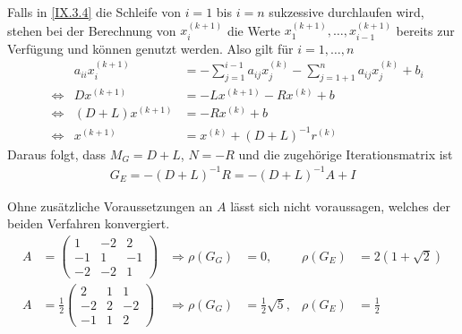 Falls in \eqref{IX.3.4} die Schleife von $i=1$ bis $i=n$
sukzessive durchlaufen wird, stehen bei der Berechnung von
$x_i^{(k+1)}$ die Werte $x_1^{(k+1)},\ldots,x_{i-1}^{(k+1)}$
bereits zur Verfügung und können genutzt werden.
Also gilt für $i=1,\ldots,n$
\begin{align}
  &&a_{ii}x_i^{(k+1)} & = -\sum_{j=1}^{i-1}a_{ij}x_j^{(k)}
                        -\sum_{j=1+1}^{n}a_{ij}x_j^{(k)}+ b_i
                        \label{IX.3.5} \\\nonumber
  &\Longleftrightarrow &Dx^{(k+1)}&=-Lx^{(k+1)}-Rx^{(k)}+b \\
  &\Longleftrightarrow &(D+L)x^{(k+1)}&=-Rx^{(k)}+b
                                    \label{IX.3.6} \\\nonumber
  &\Longleftrightarrow &x^{(k+1)} &= x^{(k)}+(D+L)^{-1}r^{(k)}
\end{align}
Daraus folgt, dass $M_G=D+L$, $N=-R$ 
und die zugehörige Iterationsmatrix ist 
\begin{gather*}
  G_E = -(D+L)^{-1}R = -(D+L)^{-1}A+I
\end{gather*}

\begin{Bspe}
  Ohne zusätzliche Voraussetzungen an $A$ lässt sich
  nicht voraussagen, welches der beiden Verfahren konvergiert.
  \begin{align*}
    A&= \begin{pmatrix}
      1&-2&2\\
      -1&1&-1\\
      -2&-2&1
    \end{pmatrix}
    &\Longrightarrow \rho(G_G)&=0, &\rho(G_E)&=2(1+\sqrt{2})\\
    A&= \frac{1}{2}\begin{pmatrix}
      2&1&1\\
      -2&2&-2\\
      -1&1&2
    \end{pmatrix}
    &\Longrightarrow \rho(G_G)&=\frac{1}{2}\sqrt{5}, &\rho(G_E)&=\frac{1}{2}
  \end{align*}
\end{Bspe}

